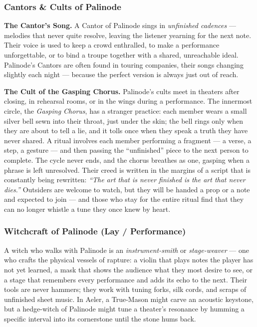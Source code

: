 \subsubsection*{Cantors \& Cults of Palinode}

\textbf{The Cantor's Song.} A Cantor of Palinode sings in \textit{unfinished cadences} --- melodies that never quite resolve, leaving the listener yearning for the next note. Their voice is used to keep a crowd enthralled, to make a performance unforgettable, or to bind a troupe together with a shared, unreachable ideal. Palinode's Cantors are often found in touring companies, their songs changing slightly each night --- because the perfect version is always just out of reach.

\textbf{The Cult of the Gasping Chorus.} Palinode's cults meet in theaters after closing, in rehearsal rooms, or in the wings during a performance. The innermost circle, the \textit{Gasping Chorus}, has a stranger practice: each member wears a small silver bell sewn into their throat, just under the skin; the bell rings only when they are about to tell a lie, and it tolls once when they speak a truth they have never shared. A ritual involves each member performing a fragment --- a verse, a step, a gesture --- and then passing the ``unfinished'' piece to the next person to complete. The cycle never ends, and the chorus breathes as one, gasping when a phrase is left unresolved. Their creed is written in the margins of a script that is constantly being rewritten: \textit{``The art that is never finished is the art that never dies.''} Outsiders are welcome to watch, but they will be handed a prop or a note and expected to join --- and those who stay for the entire ritual find that they can no longer whistle a tune they once knew by heart.

\subsubsection*{Witchcraft of Palinode (Lay / Performance)}

A witch who walks with Palinode is an \textit{instrument-smith} or \textit{stage-weaver} --- one who crafts the physical vessels of rapture: a violin that plays notes the player has not yet learned, a mask that shows the audience what they most desire to see, or a stage that remembers every performance and adds its echo to the next. Their tools are never hammers; they work with tuning forks, silk cords, and scraps of unfinished sheet music. In Aeler, a True-Mason might carve an acoustic keystone, but a hedge-witch of Palinode might tune a theater's resonance by humming a specific interval into its cornerstone until the stone hums back.

